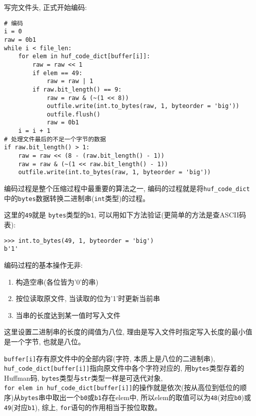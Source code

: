 \documentclass[a4paper]{ctexart}
\begin{document}
写完文件头, 正式开始编码:

{\setmainfont{Courier New Bold}              
\begin{lstlisting}
# 编码
i = 0
raw = 0b1
while i < file_len:
    for elem in huf_code_dict[buffer[i]]:
        raw = raw << 1
        if elem == 49:
            raw = raw | 1
        if raw.bit_length() == 9:
            raw = raw & (~(1 << 8))
            outfile.write(int.to_bytes(raw, 1, byteorder = 'big'))
            outfile.flush()
            raw = 0b1
    i = i + 1
# 处理文件最后的不足一个字节的数据
if raw.bit_length() > 1:
    raw = raw << (8 - (raw.bit_length() - 1))
    raw = raw & (~(1 << raw.bit_length() - 1))
    outfile.write(int.to_bytes(raw, 1, byteorder = 'big'))
\end{lstlisting}}

编码过程是整个压缩过程中最重要的算法之一, 编码的过程就是将\texttt{huf\_code\_dict}中的\texttt{bytes}数据转换二进制串(\texttt{int}类型)的过程。

这里的\texttt{49}就是 \texttt{bytes}类型的\texttt{b\textquotesingle{}1\textquotesingle{}},
可以用如下方法验证(更简单的方法是查ASCII码表):

{\setmainfont{Courier New Bold}              
\begin{lstlisting}
>>> int.to_bytes(49, 1, byteorder = 'big')
b'1'
\end{lstlisting}}

编码过程的基本操作无非:

\begin{enumerate}
\def\labelenumi{\arabic{enumi}.}
\item
  构造空串(各位皆为'0'的串)
\item
  按位读取原文件, 当读取的位为'1'时更新当前串
\item
  当串的长度达到某一值时写入文件
\end{enumerate}

这里设置二进制串的长度的阈值为八位, 理由是写入文件时指定写入长度的最小值是一个字节, 也就是八位。

\texttt{buffer{[}i{]}}存有原文件中的全部内容(字符, 本质上是八位的二进制串), \texttt{huf\_code\_dict{[}buffer{[}i{]}{]}}指向原文件中各个字符对应的, 用\texttt{bytes}类型存着的Huffman码, \texttt{bytes}类型与\texttt{str}类型一样是可迭代对象, \texttt{for\ elem\ in\ huf\_code\_dict{[}buffer{[}i{]}{]}}的操作就是依次(按从高位到低位的顺序)从\texttt{bytes}串中取出一个\texttt{b\textquotesingle{}0\textquotesingle{}}或\texttt{b\textquotesingle{}1\textquotesingle{}}存在elem中, 所以elem的取值可以为\texttt{48}(对应\texttt{b\textquotesingle{}0\textquotesingle{}})或\texttt{49}(对应\texttt{b\textquotesingle{}1\textquotesingle{}}), 综上, \texttt{for}语句的作用相当于按位取数。
\end{document}

